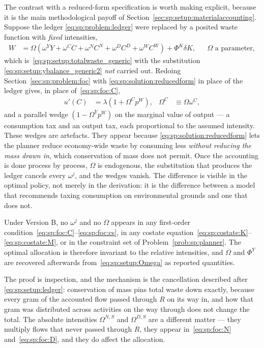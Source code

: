 The contrast with a reduced-form specification is worth making explicit, because it is the main
methodological payoff of Section~\ref{sec:sp:setup:materialaccounting}. Suppose the ledger
\eqref{eq:sp:problem:ledger} were replaced by a posited waste function with \emph{fixed} intensities,
\begin{align}
W &= \Omega\left(\omega^YY+\omega^CC+\omega^{N}C^N+\omega^{D}C^D+\omega^WC^W\right)+\Phi^K\delta K,
&&\Omega \text{ a parameter},
\label{eq:sp:solution:reducedform}
\end{align}
which is~\eqref{eq:sp:setup:totalwaste_generic} with the substitution
\eqref{eq:sp:setup:ybalance_generic2} \emph{not} carried out. Redoing
Section~\ref{sec:sp:problem:foc} with \eqref{eq:sp:solution:reducedform} in place of the ledger
gives, in place of~\eqref{eq:sp:foc:C},
\begin{align}
u'\!\left(C\right) &= \lambda\left(1+\Omega^Cp^W\right),
&
\Omega^C&\equiv\Omega\omega^C,
\label{eq:sp:solution:spurious-C}
\end{align}
and a parallel wedge $\left(1-\Omega^Yp^W\right)$ on the marginal value of output --- a consumption
tax and an output tax, each proportional to the assumed intensity. These wedges are artefacts. They
appear because \eqref{eq:sp:solution:reducedform} lets the planner reduce economy-wide waste by
consuming less \emph{without reducing the mass drawn in}, which conservation of mass does not
permit. Once the accounting is done process by process, $\Omega$ is endogenous, the substitution
that produces the ledger cancels every $\omega^j$, and the wedges vanish. The difference is visible
in the optimal policy, not merely in the derivation: it is the difference between a model that
recommends taxing consumption on environmental grounds and one that does not.

\begin{proposition}\label{prop:sp:irrelevance}
Under Version B, no $\omega^j$ and no $\Omega$ appears in any first-order
condition~\eqref{eq:sp:foc:C}--\eqref{eq:sp:foc:cs}, in any costate
equation~\eqref{eq:sp:costate:K}--\eqref{eq:sp:costate:M}, or in the constraint set of
Problem~\ref{prob:sp:planner}. The optimal allocation is therefore invariant to the relative
intensities, and $\Omega$ and $\Phi^Y$ are recovered afterwards
from~\eqref{eq:sp:setup:Omega} as reported quantities.
\end{proposition}

The proof is inspection, and the mechanism is the cancellation described after
\eqref{eq:sp:setup:ledger}: conservation of mass pins total waste down exactly, because every gram
of the accounted flow passed through $R$ on its way in, and how that gram was distributed across
activities on the way through does not change the total. The absolute intensities $\Omega^{N,S}$ and
$\Omega^{D,S}$ are a different matter --- they multiply flows that never passed through $R$, they
appear in~\eqref{eq:sp:foc:N} and~\eqref{eq:sp:foc:D}, and they do affect the allocation.

